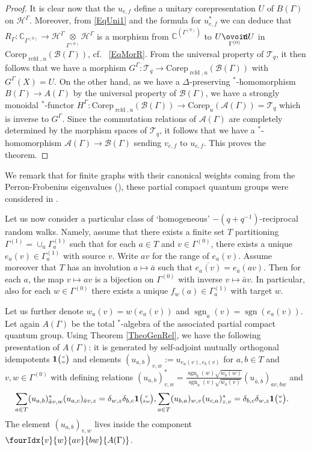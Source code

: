 \documentclass[10pt]{article}
\DeclareMathOperator{\rcf}{\mathrm{rcfd}}
\DeclareMathOperator{\sgn}{\mathrm{sgn}}
\newcommand{\Corep}{\mathrm{Corep}}
\newcommand{\Circtv}[1]{\underset{#1}{\mathop{\ooalign{$\ovoid$\cr\hidewidth\raise-.05ex\hbox{$\scriptstyle\mathsf T\mkern3.5mu$}\cr}}}} %
\newcommand{\C}{\mathbb{C}}
\newcommand{\Hsp}{\mathcal{H}}
\newcommand{\Grt}[3]{#1{\tiny {\begin{pmatrix} #2\\#3\end{pmatrix}}}}
\newcommand{\UnitC}[2]{\Grt{\mathbf{1}}{#1}{#2}}
\newcommand{\Gr}[5]{\fourIdx{#2}{#4}{#3}{#5}{#1}}%
\theoremstyle{definition}
\numberwithin{equation}{section}
\begin{document}
\begin{proof}
It is clear now that the $u_{e,f}$ define a unitary corepresentation $U$ of $B(\Gamma)$ on $\Hsp^{\Gamma}$. Moreover, from \eqref{EqUni1} and the formula for $u_{e,f}^*$ we can deduce that $R_{\Gamma}: \C_{\Gamma^{(0)}}\rightarrow \Hsp^{\Gamma}\underset{\Gamma^{(0)}}{\otimes}\Hsp^{\Gamma}$ is a morphism from $\C^{(\Gamma^{(0)})}$ to $U\Circtv{\Gamma^{(0)}} U$ in $\Corep_{\rcf,u}(\mathscr{B}(\Gamma))$, cf.~ \eqref{EqMorR}. From the universal property of $\mathcal{T}_q$, it then follows that we have a morphism $G^{\Gamma}: \mathcal{T}_q \rightarrow \Corep_{\rcf,u}(\mathscr{B}(\Gamma))$ with $G^{\Gamma}(X) = U$. On the other hand, as we have a $\Delta$-preserving $^*$-homomorphism $B(\Gamma)\rightarrow A(\Gamma)$ by the universal property of $\mathscr{B}(\Gamma)$, we have a strongly monoidal $^*$-functor $H^{\Gamma}:  \Corep_{\rcf,u}(\mathscr{B}(\Gamma))\rightarrow \Corep_u(\mathscr{A}(\Gamma)) = \mathcal{T}_q$ which is inverse to $G^{\Gamma}$. Since the commutation relations of $\mathscr{A}(\Gamma)$ are completely determined by the morphism spaces of $\mathcal{T}_q$, it follows that we have a $^*$-homomorphism $\mathscr{A}(\Gamma)\rightarrow \mathscr{B}(\Gamma)$ sending $v_{e,f}$ to $u_{e,f}$. This proves the theorem. 
\end{proof}

We remark that for finite graphs with their canonical weights coming from the Perron-Frobenius eigenvalues (\cite[Section 3.1]{DCY2}), these partial compact quantum groups were considered in \cite[Section 6]{Hay1}.


Let us now consider a particular class of `homogeneous' $-(q+q^{-1})$-reciprocal random walks. Namely, assume that there exists a finite set $T$ partitioning $\Gamma^{(1)} = \cup_a \Gamma^{(1)}_a$ such that for each $a\in T$ and $v\in \Gamma^{(0)}$, there exists a unique $e_a(v)\in \Gamma^{(1)}_a$ with source $v$. Write $av$ for the range of $e_a(v)$. Assume moreover that $T$ has an involution $a\mapsto \bar{a}$ such that $\overline{e_a(v)} = e_{\bar{a}}(av)$. Then for each $a$, the map $v\mapsto av$ is a bijection on $\Gamma^{(0)}$ with inverse $v\mapsto \bar{a}v$. In particular, also for each $w\in \Gamma^{(0)}$ there exists a unique $f_w(a) \in \Gamma^{(1)}_a$ with target $w$.

Let us further denote $w_a(v) = w(e_a(v))$ and $\sgn_a(v) = \sgn(e_a(v))$. Let again $A(\Gamma)$ be the total $^*$-algebra of the associated partial compact quantum group. Using Theorem \ref{TheoGenRel}, we have the following presentation of $A(\Gamma)$: it is generated by self-adjoint mutually orthogonal idempotents $\UnitC{v}{w}$ and elements $(u_{a,b})_{v,w} := u_{e_a(v),e_b(v)}$ for $a,b\in T$ and $v,w\in \Gamma^{(0)}$ with defining relations $(u_{a,b})_{v,w}^* = \frac{\sgn_b(w)\sqrt{w_b(w)}}{\sgn_a(v)\sqrt{w_a(v)}}(u_{\bar{a},\bar{b}})_{av,bw}$ and \begin{eqnarray*} \sum_{a\in T} (u_{a,b})_{\bar{a}v,w}^* (u_{a,c})_{\bar{a}v,z}= \delta_{w,z} \delta_{b,c} \UnitC{v}{bw},& \sum_{a\in T} (u_{b,a})_{w,v} (u_{c,a})_{z,v}^* = \delta_{b,c}\delta_{w,z} \UnitC{w}{v}.\end{eqnarray*} The element $(u_{a,b})_{v,w}$ lives inside the component $\Gr{A(\Gamma)}{v}{av}{w}{bw}$.
\end{document}
